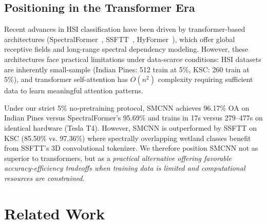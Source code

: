 \documentclass[conference]{IEEEtran}
\begin{document}
\begin{table}[!t]
\caption{Pipeline Components and Their Roles}
\label{tab:components}
\centering
{}
\end{table}

\subsection{Positioning in the Transformer Era}

Recent advances in HSI classification have been driven by transformer-based architectures (SpectralFormer~\cite{hong2022spectralformer}, SSFTT~\cite{sun2022ssftt}, HyFormer~\cite{li2023hyformer}), which offer global receptive fields and long-range spectral dependency modeling. However, these architectures face practical limitations under data-scarce conditions: HSI datasets are inherently small-sample (Indian Pines: 512 train at 5\%, KSC: 260 train at 5\%), and transformer self-attention has $O(n^2)$ complexity requiring sufficient data to learn meaningful attention patterns.

Under our strict 5\% no-pretraining protocol, SMCNN achieves 96.17\% OA on Indian Pines versus SpectralFormer's 95.69\% and trains in 17s versus 279--477s on identical hardware (Tesla T4). However, SMCNN is outperformed by SSFTT on KSC (85.50\% vs. 97.36\%) where spectrally overlapping wetland classes benefit from SSFTT's 3D convolutional tokenizer. We therefore position SMCNN not as superior to transformers, but as a \textit{practical alternative offering favorable accuracy-efficiency tradeoffs when training data is limited and computational resources are constrained}.

\section{Related Work}
\end{document}
